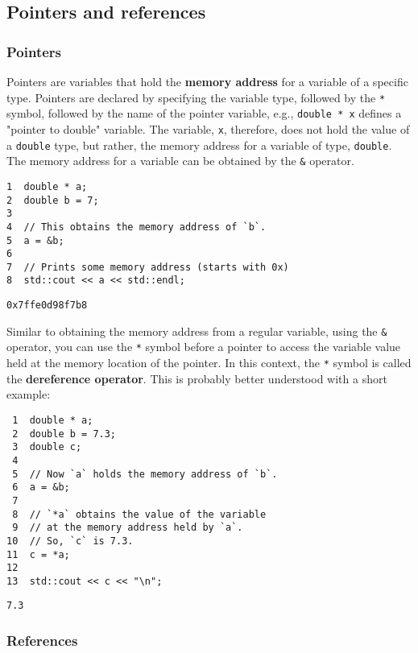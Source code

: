 \documentclass[11pt]{article}
\begin{document}
\subsection{Pointers and references}
\label{sec:orgheadline20}
\subsubsection{Pointers}
\label{sec:orgheadline17}
Pointers are variables that hold the \textbf{memory address} for a variable 
of a specific type. Pointers are declared by specifying the variable 
type, followed by the \texttt{*} symbol, followed by the name of the pointer 
variable, e.g., \texttt{double * x} defines a "pointer to double" variable. 
The variable, \texttt{x}, therefore, does not hold the value of a \texttt{double} 
type, but rather, the memory address for a variable of type, \texttt{double}.
The memory address for a variable can be obtained by the \texttt{\&} operator.

\begin{verbatim}
1  double * a;
2  double b = 7;
3  
4  // This obtains the memory address of `b`.
5  a = &b;
6  
7  // Prints some memory address (starts with 0x)
8  std::cout << a << std::endl;
\end{verbatim}

\begin{verbatim}
0x7ffe0d98f7b8
\end{verbatim}

Similar to obtaining the memory address from a regular variable, using the
\texttt{\&} operator, you can use the \texttt{*} symbol before a pointer to access the 
variable value held at the memory location of the pointer. In this context,
the \texttt{*} symbol is called the \textbf{dereference operator}. This is probably better 
understood with a short example:

\begin{verbatim}
 1  double * a;
 2  double b = 7.3;
 3  double c;
 4  
 5  // Now `a` holds the memory address of `b`.
 6  a = &b;
 7  
 8  // `*a` obtains the value of the variable
 9  // at the memory address held by `a`.
10  // So, `c` is 7.3.
11  c = *a;
12  
13  std::cout << c << "\n";
\end{verbatim}

\begin{verbatim}
7.3
\end{verbatim}

\subsubsection{References}
\label{sec:orgheadline19}
\end{document}
